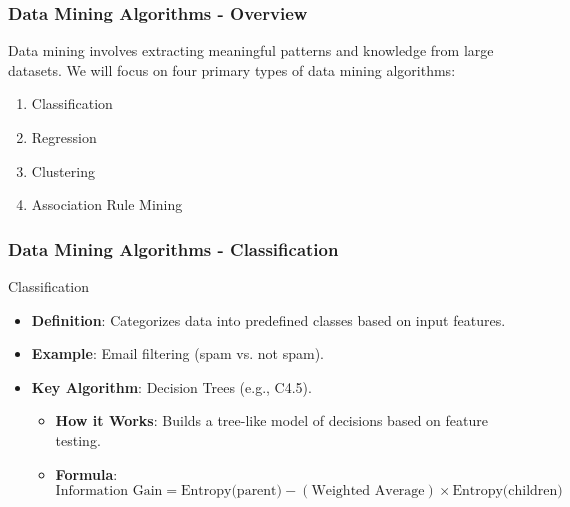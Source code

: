 \documentclass{beamer}
\begin{document}
\begin{frame}[fragile]
    \frametitle{Data Mining Algorithms - Overview}
    Data mining involves extracting meaningful patterns and knowledge from large datasets. 
    We will focus on four primary types of data mining algorithms:
    \begin{enumerate}
        \item Classification
        \item Regression
        \item Clustering
        \item Association Rule Mining
    \end{enumerate}
\end{frame}

\begin{frame}[fragile]
    \frametitle{Data Mining Algorithms - Classification}
    \begin{block}{Classification}
        \begin{itemize}
            \item \textbf{Definition}: Categorizes data into predefined classes based on input features.
            \item \textbf{Example}: Email filtering (spam vs. not spam).
            \item \textbf{Key Algorithm}: Decision Trees (e.g., C4.5).
            \begin{itemize}
                \item \textbf{How it Works}: Builds a tree-like model of decisions based on feature testing.
                \item \textbf{Formula}:
                \begin{equation}
                    \text{Information Gain} = \text{Entropy(parent)} - (\text{Weighted Average}) \times \text{Entropy(children)}
                \end{equation}
            \end{itemize}
        \end{itemize}
    \end{block}
\end{frame}
\end{document}

